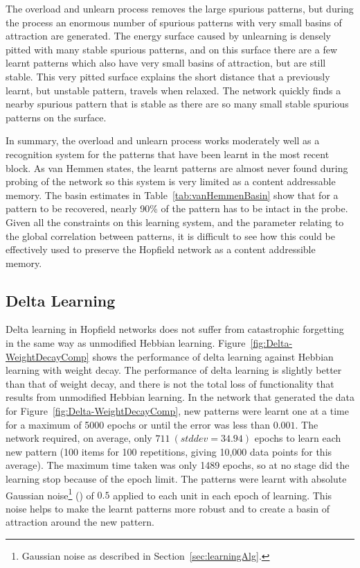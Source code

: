 The overload and unlearn process removes the large spurious patterns, but during the process an enormous number of spurious patterns with very small basins of attraction are generated.  The energy surface caused by unlearning is densely pitted with many stable spurious patterns, and on this surface there are a few learnt patterns which also have very small basins of attraction, but are still stable.  This very pitted surface explains the short distance that a previously learnt, but unstable pattern, travels when relaxed.  The network quickly finds a nearby spurious pattern that is stable as there are so many small stable spurious patterns on the surface.

In summary, the overload and unlearn process works moderately well as a recognition system for the patterns that have been learnt in the most recent block.  As van Hemmen states, the learnt patterns are almost never found during probing of the network so this system is very limited as a content addressable memory.  The basin estimates in Table~\ref{tab:vanHemmenBasin} show that for a pattern to be recovered, nearly 90\% of the pattern has to be intact in the probe.  Given all the constraints on this learning system, and the parameter relating to the global correlation between patterns, it is difficult to see how this could be effectively used to preserve the Hopfield network as a content addressible memory.

\subsection{Delta Learning}
\label{sec:deltaLearningSolution}

Delta learning in Hopfield networks does not suffer from catastrophic forgetting in the same way as unmodified Hebbian learning.  Figure~\ref{fig:Delta-WeightDecayComp} shows the performance of delta learning against Hebbian learning with weight decay.  The performance of delta learning is slightly better than that of weight decay, and there is not the total loss of functionality that results from unmodified Hebbian learning.  In the network that generated the data for Figure~\ref{fig:Delta-WeightDecayComp}, new patterns were learnt one at a time for a maximum of 5000 epochs or until the error was less than $0.001$.  The network required, on average, only $711\ (stddev=34.94)$ epochs to learn each new pattern (100 items for 100 repetitions, giving 10,000 data points for this average).  The maximum time taken was only 1489 epochs, so at no stage did the learning stop because of the epoch limit.  The patterns were learnt with absolute Gaussian noise\footnote{Gaussian noise as described in Section~\ref{sec:learningAlg}.} () of $0.5$ applied to each unit in each epoch of learning.  This noise helps to make the learnt patterns more robust and to create a basin of attraction around the new pattern.

